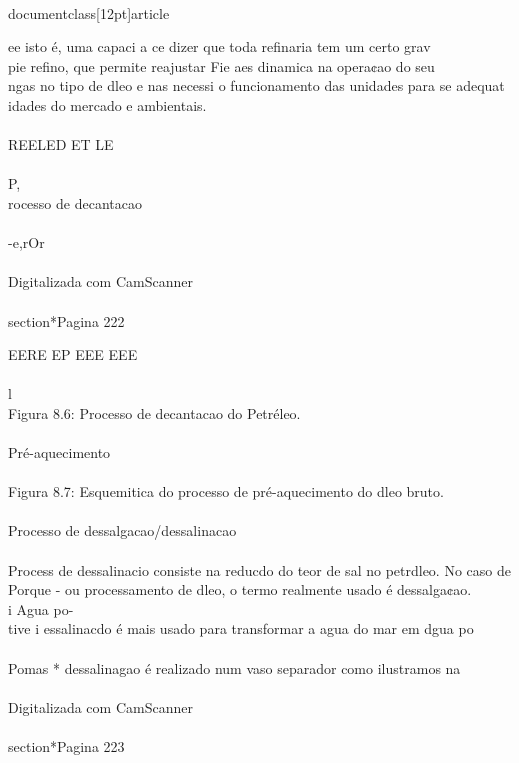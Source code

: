 \\documentclass[12pt]{article}
\begin{document}
ee isto é, uma capaci a ce dizer que toda refinaria tem um certo grav\\
pie refino, que permite reajustar Fie aes dinamica na opera¢ao do seu\\
ngas no tipo de dleo e nas necessi o funcionamento das unidades para se adequat\\
idades do mercado e ambientais.\\
\\
REELED ET LE\\
\\
P,\\
rocesso de decantacao\\
\\
-e,rOr\\
\\
Digitalizada com CamScanner\\

\\section*{Pagina 222}

EERE EP EEE EEE\\
\\
l\\
Figura 8.6: Processo de decantacao do Petréleo.\\
\\
Pré-aquecimento\\
\\
Figura 8.7: Esquemitica do processo de pré-aquecimento do dleo bruto.\\
\\
Processo de dessalgacao/dessalinacao\\
\\
Process de dessalinacio consiste na reducdo do teor de sal no petrdleo. No caso de\\
Porque - ou processamento de dleo, o termo realmente usado é dessalga¢ao.\\
i Agua po-\\
tive i essalinacdo é mais usado para transformar a agua do mar em dgua po\\
\\
Pomas * dessalinagao é realizado num vaso separador como ilustramos na\\
\\
Digitalizada com CamScanner\\

\\section*{Pagina 223}
\end{document}

